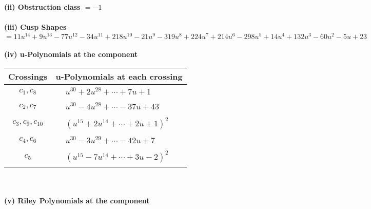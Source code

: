 \documentclass[1p]{elsarticle_modified}
\theoremstyle{definition}
\begin{document}
\flushleft \textbf{(ii) Obstruction class $= -1$}\\~\\
\flushleft \textbf{(iii) Cusp Shapes $= 11 u^{14}+9 u^{13}-77 u^{12}-34 u^{11}+218 u^{10}-21 u^9-319 u^8+224 u^7+214 u^6-298 u^5+14 u^4+132 u^3-60 u^2-5 u+23$}\\~\\
\newpage\renewcommand{\arraystretch}{1}
\flushleft \textbf{(iv) u-Polynomials at the component}\newline \\
\begin{tabular}{m{50pt}|m{274pt}}
Crossings & \hspace{64pt}u-Polynomials at each crossing \\
\hline $$\begin{aligned}c_{1},c_{8}\end{aligned}$$&$\begin{aligned}
&u^{30}+2 u^{28}+\cdots+7 u+1
\end{aligned}$\\
\hline $$\begin{aligned}c_{2},c_{7}\end{aligned}$$&$\begin{aligned}
&u^{30}-4 u^{28}+\cdots-37 u+43
\end{aligned}$\\
\hline $$\begin{aligned}c_{3},c_{9},c_{10}\end{aligned}$$&$\begin{aligned}
&(u^{15}+2 u^{14}+\cdots+2 u+1)^{2}
\end{aligned}$\\
\hline $$\begin{aligned}c_{4},c_{6}\end{aligned}$$&$\begin{aligned}
&u^{30}-3 u^{29}+\cdots-42 u+7
\end{aligned}$\\
\hline $$\begin{aligned}c_{5}\end{aligned}$$&$\begin{aligned}
&(u^{15}-7 u^{14}+\cdots+3 u-2)^{2}
\end{aligned}$\\
\hline
\end{tabular}\\~\\
\newpage\renewcommand{\arraystretch}{1}
\flushleft \textbf{(v) Riley Polynomials at the component}\newline \\
\end{document}
